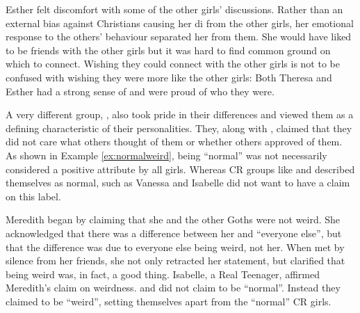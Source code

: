 \vspace{5 mm}

\noindent Esther felt discomfort with some of the other girls' discussions. Rather than an external bias against Christians causing her di from the other girls, her emotional response to the others' behaviour separated her from them. She would have liked to be friends with the other girls but it was hard to find common ground on which to connect. Wishing they could connect with the other girls is not to be confused with wishing they were more like the other girls: Both Theresa and Esther had a strong sense of  and were proud of who they were.

A very different group, , also took pride in their differences and viewed them as a defining characteristic of their personalities. They, along with , claimed that they did not care what others thought of them or whether others approved of them. As shown in Example \ref{ex:normalweird}, being ``normal'' was not necessarily considered a positive attribute by all girls. Whereas CR groups like  and  described themselves as normal,  such as Vanessa and Isabelle did not want to have a claim on this label.

\label{ex:normalweird}

\vspace{5 mm}

\noindent Meredith began by claiming that she and the other Goths were not weird. She acknowledged that there was a difference between her and ``everyone else'', but that the difference was due to everyone else being weird, not her. When met by silence from her friends, she not only retracted her statement, but clarified that being weird was, in fact, a good thing. Isabelle, a Real Teenager, affirmed Meredith's claim on weirdness.  and  did not claim to be ``normal''. Instead they claimed to be ``weird'', setting themselves apart from the ``normal'' CR girls. 

